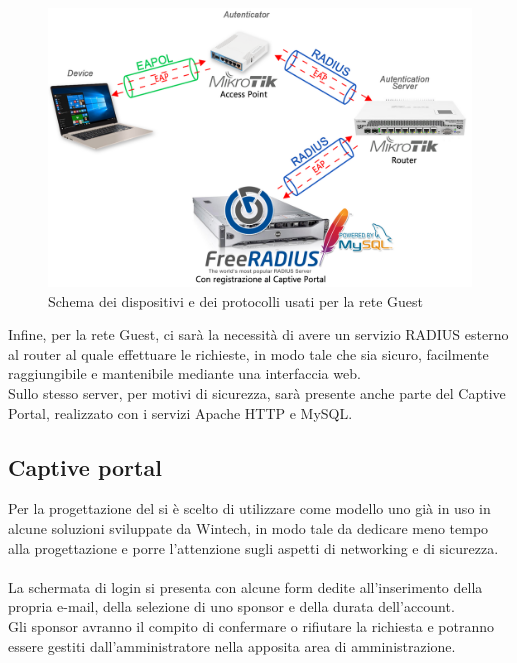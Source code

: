 \documentclass[Realizzazione.tex]{subfiles}
\begin{document}
\newpage
\begin{figure}[H]
	\centering
	\includegraphics[width=1.1\linewidth]{"images/Schema_tecnologie_RADIUS"}
	\caption{Schema dei dispositivi e dei protocolli usati per la rete Guest}
	\label{fig:Schema dei dispositivi e dei protocolli usati per la rete Guest}
\end{figure}
Infine, per la rete Guest, ci sarà la necessità di avere un servizio RADIUS esterno al router al quale effettuare le richieste, in modo tale che sia sicuro, facilmente raggiungibile e mantenibile mediante una interfaccia web. \\
Sullo stesso server, per motivi di sicurezza, sarà presente anche parte del Captive Portal, realizzato con i servizi Apache HTTP e MySQL.

\newpage
\subsection{Captive portal}
Per la progettazione del  si è scelto di utilizzare come modello uno già in uso in alcune soluzioni sviluppate da Wintech, in modo tale da dedicare meno tempo alla progettazione e porre l'attenzione sugli aspetti di networking e di sicurezza. \\\\
La schermata di login si presenta con alcune form dedite all'inserimento della propria e-mail, della selezione di uno sponsor e della durata dell'account. \\
Gli sponsor avranno il compito di confermare o rifiutare la richiesta e potranno essere gestiti dall'amministratore nella apposita area di amministrazione. \\
\end{document}
